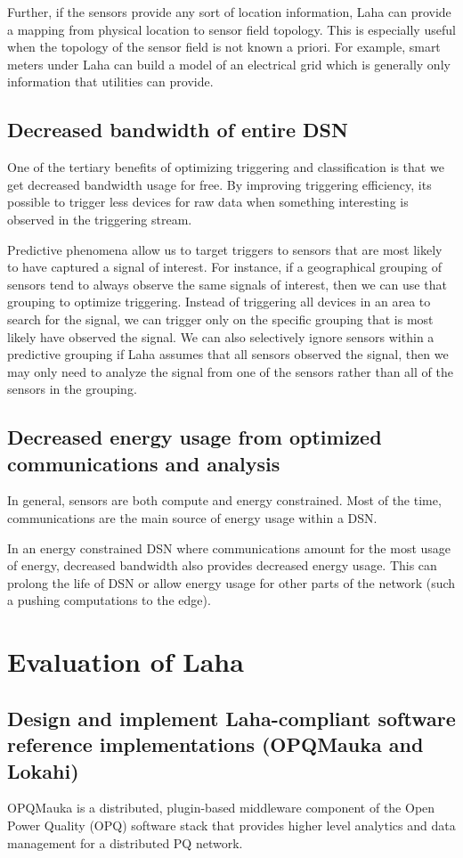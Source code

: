 Further, if the sensors provide any sort of location information, Laha can provide a mapping from physical location to sensor field topology. This is especially useful when the topology of the sensor field is not known a priori. For example, smart meters under Laha can build a model of an electrical grid which is generally only information that utilities can provide.


\subsection{Decreased bandwidth of entire DSN}
One of the tertiary benefits of optimizing triggering and classification is that we get decreased bandwidth usage for free. By improving triggering efficiency, its possible to trigger less devices for raw data when something interesting is observed in the triggering stream.

Predictive phenomena allow us to target triggers to sensors that are most likely to have captured a signal of interest. For instance, if a geographical grouping of sensors tend to always observe the same signals of interest, then we can use that grouping to optimize triggering. Instead of triggering all devices in an area to search for the signal, we can trigger only on the specific grouping that is most likely have observed the signal. We can also selectively ignore sensors within a predictive grouping if Laha assumes that all sensors observed the signal, then we may only need to analyze the signal from one of the sensors rather than all of the sensors in the grouping.

\subsection{Decreased energy usage from optimized communications and analysis}
In general, sensors are both compute and energy constrained. Most of the time, communications are the main source of energy usage within a DSN.

In an energy constrained DSN where communications amount for the most usage of energy, decreased bandwidth also provides decreased energy usage. This can prolong the life of DSN or allow energy usage for other parts of the network (such a pushing computations to the edge).

\section{Evaluation of Laha}
\subsection{Design and implement Laha-compliant software reference implementations (OPQMauka and Lokahi)}
OPQMauka is a distributed, plugin-based middleware component of the Open Power Quality (OPQ) software stack that provides higher level analytics and data management for a distributed PQ network.

